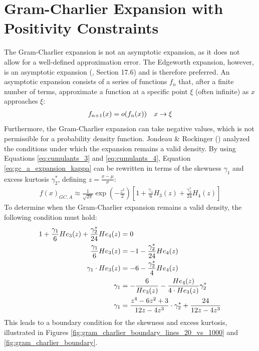\section{Gram-Charlier Expansion with Positivity Constraints}

The Gram-Charlier expansion is not an asymptotic expansion, as it does not allow for a well-defined approximation error. The Edgeworth expansion, however, is an asymptotic expansion (\cite{cramerMathematicalMethodsStatistics1999}, Section 17.6) and is therefore preferred. An asymptotic expansion consists of a series of functions $f_n$ that, after a finite number of terms, approximate a function at a specific point $\xi$ (often infinite) as $x$ approaches $\xi$:
\begin{align}
    f_{n+1}(x) = o(f_n(x)) \quad x\to\xi \notag
\end{align}
Furthermore, the Gram-Charlier expansion can take negative values, which is not permissible for a probability density function. Jondeau \& Rockinger (\citeyear{jondeauGramCharlierDensities2001}) analyzed the conditions under which the expansion remains a valid density. By using Equations \eqref{eq:cumulants_3} and \eqref{eq:cumulants_4}, Equation \eqref{eq:gc_a_expansion_kappa} can be rewritten in terms of the skewness $\gamma_1$ and excess kurtosis $\gamma_2^*$, defining $z = \frac{x-\mu}{\sigma}$:
\begin{align}
    \label{eq:gc_a_expansion_s_ek}
    f(x)_{GC,A} \approx \frac{1}{\sqrt{2\pi}}\exp\left(-\frac{z^2}{2}\right) \left[1 + \frac{\gamma_1}{6}H_3(z) + \frac{\gamma_2^*}{24}H_4(z)\right]
\end{align}
To determine when the Gram-Charlier expansion remains a valid density, the following condition must hold:
\begin{align}
    1 + \frac{\gamma_1}{6}He_3(z) + \frac{\gamma_2^*}{24}He_4(z) &= 0 \notag \\
    \frac{\gamma_1}{6}He_3(z) &= -1 - \frac{\gamma_2^*}{24}He_4(z) \notag \\
    \gamma_1\cdot He_3(z) &= -6 - \frac{\gamma_2^*}{4}He_4(z) \notag \\
    \gamma_1 &= -\frac{6}{He_3(z)} - \frac{He_4(z)}{4\cdot He_3(z)}\gamma_2^* \notag \\
    \gamma_1 &= \frac{z^4-6z^2+3}{12z-4z^3}\cdot \gamma_2^* + \frac{24}{12z-4z^3} \notag
\end{align}
This leads to a boundary condition for the skewness and excess kurtosis, illustrated in Figures \ref{fig:gram_charlier_boundary_lines_20_vs_1000} and \ref{fig:gram_charlier_boundary}.

